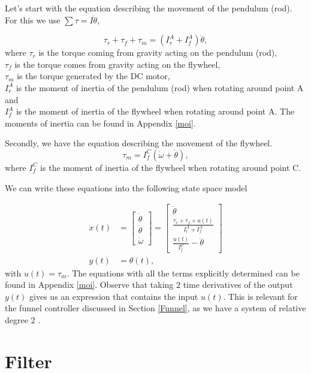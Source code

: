 \documentclass{article}
\begin{document}
Let's start with the equation describing the movement of the pendulum (rod). For this we use $\sum \tau = I \ddot{\theta}$,

$$
\tau_{r} + \tau_{f} + \tau_{m} = (I_r^A + I_f^A) \ddot{\theta},
$$
where $\tau_{r}$ is the torque coming from gravity acting on the pendulum (rod), \\ 
$\tau_{f}$ is the torque comes from gravity acting on the flywheel, \\
$\tau_{m}$ is the torque generated by the DC motor, \\
$I_r^A$ is the moment of inertia of the pendulum (rod) when rotating around point A and \\
$I_f^A$ is the moment of inertia of the flywheel when rotating around point A.
The moments of inertia can be found in Appendix \ref{moi}.

Secondly, we have the equation describing the movement of the flywheel.
$$
\tau_m = I_f^C (\dot{\omega} + \ddot{\theta}),
$$
where $I_f^C$ is the moment of inertia of the flywheel when rotating around point C.

We can write these equations into the following state space model

\begin{align} \label{statespace}
    \dot{x}(t) &= 
\begin{bmatrix}
\dot{\theta} \\
\ddot{\theta} \\
\dot{\omega}
\end{bmatrix}
=
\begin{bmatrix}
\dot{\theta} \\
\frac{\tau_{r} + \tau_{f} + u(t)}
{I_r^A + I_f^A} \\
\frac{u(t)}{I_f^C} - \ddot{\theta}
\end{bmatrix} \\
y(t) &= \theta(t),
\end{align}
with $u(t) = \tau_m$.
The equations with all the terms explicitly determined can be found in Appendix \ref{moi}.
Observe that taking $2$ time derivatives of the output $y(t)$ gives us an expression that contains the input $u(t)$. This is relevant for the funnel controller discussed in Section \ref{Funnel}, as we have a system of relative degree $2$ .

\newpage
\section{Filter} \label{Filter}
\end{document}
